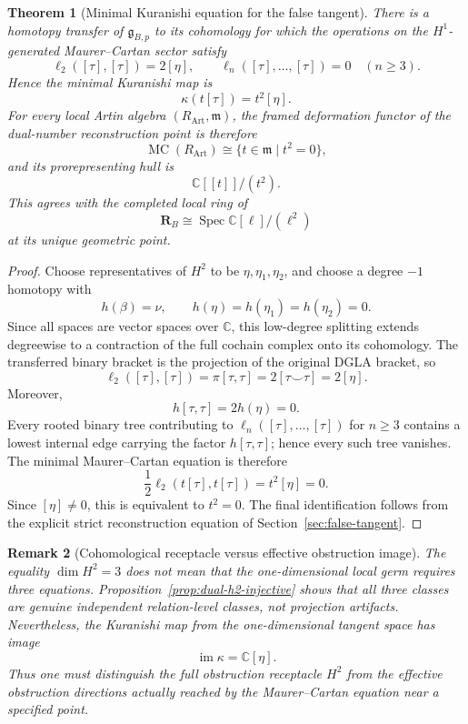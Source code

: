 \documentclass[11pt]{amsart}
\newtheorem{theorem}{Theorem}[section]
\newtheorem{remark}[theorem]{Remark}
\newcommand{\Spec}{\operatorname{Spec}}
\newcommand{\C}{\mathbb C}
\newcommand{\MC}{\operatorname{MC}}
\newcommand{\ghoch}{\mathfrak g}
\begin{document}
\begin{theorem}[Minimal Kuranishi equation for the false tangent]\label{thm:dual-minimal-kuranishi}
There is a homotopy transfer of $\ghoch_{B,p}$ to its cohomology for which the operations on the $H^1$-generated Maurer--Cartan sector satisfy
\[
\ell_2([\tau],[\tau])=2[\eta],
\qquad
\ell_n([\tau],\ldots,[\tau])=0
\quad(n\ge3).
\]
Hence the minimal Kuranishi map is
\[
\kappa(t[\tau])=t^2[\eta].
\]
For every local Artin algebra $(R_{\mathrm{Art}},\mathfrak m)$, the framed deformation functor of the dual-number reconstruction point is therefore
\[
\MC(R_{\mathrm{Art}})
\cong
\{t\in\mathfrak m\mid t^2=0\},
\]
and its prorepresenting hull is
\[
\boxed{
\C[[t]]/(t^2).
}
\]
This agrees with the completed local ring of
\[
\mathbf R_B\cong\Spec\C[\ell]/(\ell^2)
\]
at its unique geometric point.
\end{theorem}

\begin{proof}
Choose representatives of $H^2$ to be $\eta,\eta_1,\eta_2$, and choose a degree $-1$ homotopy with
\[
h(\beta)=\nu,
\qquad
h(\eta)=h(\eta_1)=h(\eta_2)=0.
\]
Since all spaces are vector spaces over $\C$, this low-degree splitting extends degreewise to a contraction of the full cochain complex onto its cohomology.  The transferred binary bracket is the projection of the original DGLA bracket, so
\[
\ell_2([\tau],[\tau])
=\pi[\tau,\tau]
=2[\tau\smile\tau]
=2[\eta].
\]
Moreover,
\[
h[\tau,\tau]=2h(\eta)=0.
\]
Every rooted binary tree contributing to $\ell_n([\tau],\ldots,[\tau])$ for $n\ge3$ contains a lowest internal edge carrying the factor $h[\tau,\tau]$; hence every such tree vanishes.  The minimal Maurer--Cartan equation is therefore
\[
\frac12\ell_2(t[\tau],t[\tau])=t^2[\eta]=0.
\]
Since $[\eta]\neq0$, this is equivalent to $t^2=0$.  The final identification follows from the explicit strict reconstruction equation of Section~\ref{sec:false-tangent}.
\end{proof}

\begin{remark}[Cohomological receptacle versus effective obstruction image]
The equality $\dim H^2=3$ does not mean that the one-dimensional local germ requires three equations.  Proposition~\ref{prop:dual-h2-injective} shows that all three classes are genuine independent relation-level classes, not projection artifacts.  Nevertheless, the Kuranishi map from the one-dimensional tangent space has image
\[
\operatorname{im}\kappa=\C[\eta].
\]
Thus one must distinguish the full obstruction receptacle $H^2$ from the effective obstruction directions actually reached by the Maurer--Cartan equation near a specified point.
\end{remark}
\end{document}
